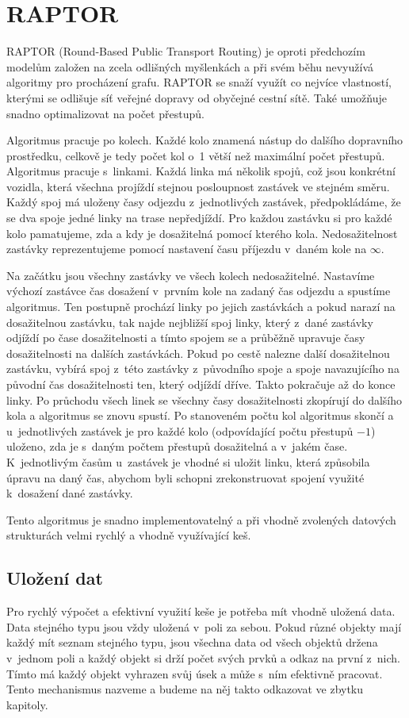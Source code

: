 \section{RAPTOR}
RAPTOR (Round-Based Public Transport Routing)\cite{RAPTOR} je oproti
předchozím modelům založen na zcela odlišných myšlenkách a při svém běhu
nevyužívá algoritmy pro procházení grafu. RAPTOR se snaží využít co nejvíce vlastností,
kterými se odlišuje síť veřejné dopravy od obyčejné cestní sítě. Také umožňuje
snadno optimalizovat na počet přestupů.

Algoritmus pracuje po kolech. Každé kolo znamená nástup do dalšího dopravního
prostředku, celkově je tedy počet kol o~1 větší než maximální počet přestupů.
Algoritmus pracuje s~linkami. Každá linka má několik spojů, což jsou konkrétní
vozidla, která všechna projíždí stejnou posloupnost zastávek ve stejném směru. Každý spoj má
uloženy časy odjezdu z~jednotlivých zastávek, předpokládáme, že se dva spoje
jedné linky na trase nepředjíždí. Pro každou zastávku si pro každé kolo
pamatujeme, zda a kdy je dosažitelná pomocí kterého kola. Nedosažitelnost
zastávky reprezentujeme pomocí nastavení času příjezdu v~daném kole na $\infty$.

Na začátku jsou všechny zastávky ve všech kolech nedosažitelné. Nastavíme
výchozí zastávce čas dosažení v~prvním kole na zadaný čas odjezdu a spustíme
algoritmus. Ten postupně prochází linky po jejich zastávkách a pokud narazí na
dosažitelnou zastávku, tak najde nejbližší spoj linky, který z~dané zastávky
odjíždí po čase dosažitelnosti a tímto spojem se  a průběžně upravuje
časy dosažitelnosti na dalších zastávkách. Pokud po cestě nalezne další
dosažitelnou zastávku, vybírá spoj z~této zastávky z~původního spoje a
spoje navazujícího na původní čas dosažitelnosti ten, který odjíždí dříve. Takto
pokračuje až do konce linky. Po průchodu všech linek se všechny časy
dosažitelnosti zkopírují do dalšího kola a algoritmus se znovu spustí. Po
stanoveném počtu kol algoritmus skončí a u~jednotlivých zastávek je pro každé
kolo (odpovídající počtu přestupů $- 1$) uloženo, zda je s~daným počtem přestupů
dosažitelná a v~jakém čase. K~jednotlivým časům u~zastávek je vhodné si uložit
linku, která způsobila úpravu na daný čas, abychom byli schopni zrekonstruovat
spojení využité k~dosažení dané zastávky. 

Tento algoritmus je snadno implementovatelný a při vhodně zvolených datových
strukturách velmi rychlý a vhodně využívající keš. 

\subsection{Uložení dat}
\label{ch:reserse:raptor-data}
Pro rychlý výpočet a efektivní využití keše je potřeba mít vhodně uložená data.
Data stejného typu jsou vždy uložená v~poli za sebou. Pokud různé objekty mají
každý mít seznam stejného typu, jsou všechna data od všech objektů držena
v~jednom poli a každý objekt si drží počet svých prvků a odkaz na první z~nich.
Tímto má každý objekt vyhrazen svůj úsek a může s~ním efektivně pracovat. Tento
mechanismus nazveme  a budeme na něj takto odkazovat ve
zbytku kapitoly.

